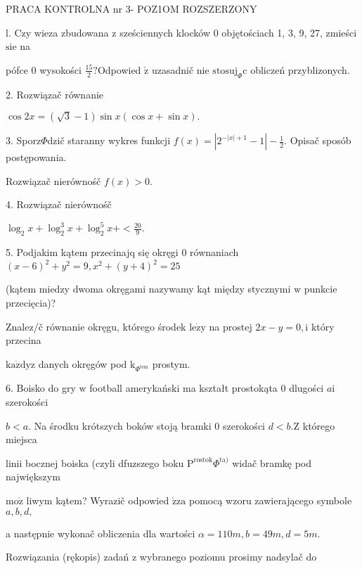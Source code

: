 \documentclass[a4paper,12pt]{article}
\begin{document}
PRACA KONTROLNA nr 3- POZ1OM ROZSZERZONY

l. Czy wieza zbudowana $\mathrm{z}$ sześciennych klocków $0$ objętościach 1, 3, 9, 27, zmieści $\mathrm{s}\mathrm{i}\mathrm{e}$ na

pófce $0$ wysokości $\displaystyle \frac{15}{2}?$Odpowied $\acute{\mathrm{z}}$ uzasadnič nie $\mathrm{s}\mathrm{t}\mathrm{o}\mathrm{s}\mathrm{u}\mathrm{j}_{\Phi}\mathrm{c}$ obliczeń przyblizonych.

2. Rozwiązač równanie

$\cos 2x=(\sqrt{3}-1)\sin x(\cos x+\sin x).$

3. Sporz$\Phi$dzič staranny wykres funkcji $f(x)=|2^{-|x|+1}-1|-\displaystyle \frac{1}{2}$. Opisač sposób postępowania.

Rozwiązač nierównośč $f(x)>0.$

4. Rozwiązač nierównośč

$\displaystyle \log_{2}x+\log_{2}^{3}x+\log_{2}^{5}x+<\frac{20}{9}.$

5. Podjakim kątem przecinajq się okręgi $0$ równaniach $(x-6)^{2}+y^{2}=9, x^{2}+(y+4)^{2}=25$

(kątem miedzy dwoma okręgami nazywamy kąt między stycznymi $\mathrm{w}$ punkcie przecięcia)?

Znalez/č równanie okręgu, którego środek $\mathrm{l}\mathrm{e}\dot{\mathrm{z}}\mathrm{y}$ na prostej $2x-y=0, \mathrm{i}$ który przecina

$\mathrm{k}\mathrm{a}\dot{\mathrm{z}}\mathrm{d}\mathrm{y}\mathrm{z}$ danych okręgów pod $\mathrm{k}_{\Phi^{\mathrm{t}\mathrm{e}\mathrm{m}}}$ prostym.

6. Boisko do gry $\mathrm{w}$ football amerykański ma kształt prostokąta $0$ dlugości $a\mathrm{i}$ szerokości

$b<a$. Na środku krótszych boków stoją bramki $0$ szerokości $d<b. \mathrm{Z}$ którego miejsca

linii bocznej boiska (czyli dfuzszego boku $\mathrm{P}^{\mathrm{r}\mathrm{o}\mathrm{s}\mathrm{t}\mathrm{o}\mathrm{k}}\Phi^{\mathrm{t}\mathrm{a})}$ widač bramkę pod największym

$\mathrm{m}\mathrm{o}\dot{\mathrm{z}}$ liwym kątem? Wyrazič odpowied $\acute{\mathrm{z}}\mathrm{z}\mathrm{a}$ pomocą wzoru zawierającego symbole $a, b, d,$

a następnie wykonač obliczenia dla wartości $\alpha=110m, b=49m, d=5m.$

Rozwiązania (rękopis) zadań z wybranego poziomu prosimy nadsylač do
\end{document}
